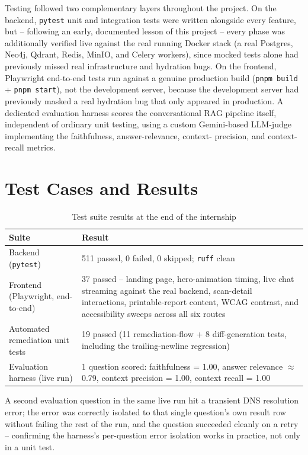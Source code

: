 \documentclass[12pt,a4paper]{report}
\begin{document}
Testing followed two complementary layers throughout the project. On the
backend, \texttt{pytest} unit and integration tests were written alongside
every feature, but -- following an early, documented lesson of this project
-- every phase was additionally verified live against the real running
Docker stack (a real Postgres, Neo4j, Qdrant, Redis, MinIO, and Celery
workers), since mocked tests alone had previously missed real infrastructure
and hydration bugs. On the frontend, Playwright end-to-end tests run against
a genuine production build (\texttt{pnpm build} + \texttt{pnpm start}), not
the development server, because the development server had previously
masked a real hydration bug that only appeared in production. A dedicated
evaluation harness scores the conversational \ac{RAG} pipeline itself,
independent of ordinary unit testing, using a custom Gemini-based
\ac{LLM}-judge implementing the faithfulness, answer-relevance, context-
precision, and context-recall metrics.

\section{Test Cases and Results}

\begin{table}[H]
\centering
\caption{Test suite results at the end of the internship}
\label{tab:testresults}
\begin{tabularx}{\textwidth}{@{}l X@{}}
\toprule
\textbf{Suite} & \textbf{Result} \\
\midrule
Backend (\texttt{pytest}) & 511 passed, 0 failed, 0 skipped; \texttt{ruff} clean \\
Frontend (Playwright, end-to-end) & 37 passed -- landing page, hero-animation timing, live chat streaming against the real backend, scan-detail interactions, printable-report content, \ac{WCAG} contrast, and accessibility sweeps across all six routes \\
Automated remediation unit tests & 19 passed (11 remediation-flow + 8 diff-generation tests, including the trailing-newline regression) \\
Evaluation harness (live run) & 1 question scored: faithfulness = 1.00, answer relevance $\approx$ 0.79, context precision = 1.00, context recall = 1.00 \\
\bottomrule
\end{tabularx}
\end{table}

A second evaluation question in the same live run hit a transient DNS
resolution error; the error was correctly isolated to that single question's
own result row without failing the rest of the run, and the question
succeeded cleanly on a retry -- confirming the harness's per-question error
isolation works in practice, not only in a unit test.
\end{document}
